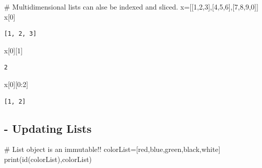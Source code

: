\documentclass[
  a4paper,
  DIV=11,
  numbers=noendperiod]{scrreprt}
\newenvironment{Shaded}{\begin{snugshade}}{\end{snugshade}}
\newcommand{\BuiltInTok}[1]{\textcolor[rgb]{0.00,0.23,0.31}{#1}}
\newcommand{\CommentTok}[1]{\textcolor[rgb]{0.37,0.37,0.37}{#1}}
\newcommand{\DecValTok}[1]{\textcolor[rgb]{0.68,0.00,0.00}{#1}}
\newcommand{\NormalTok}[1]{\textcolor[rgb]{0.00,0.23,0.31}{#1}}
\newcommand{\OperatorTok}[1]{\textcolor[rgb]{0.37,0.37,0.37}{#1}}
\newcommand{\StringTok}[1]{\textcolor[rgb]{0.13,0.47,0.30}{#1}}
\begin{document}
\begin{Shaded}
\begin{Highlighting}[]
\CommentTok{\# Multidimensional lists can alse be indexed and sliced.}
\NormalTok{x}\OperatorTok{=}\NormalTok{[[}\DecValTok{1}\NormalTok{,}\DecValTok{2}\NormalTok{,}\DecValTok{3}\NormalTok{],[}\DecValTok{4}\NormalTok{,}\DecValTok{5}\NormalTok{,}\DecValTok{6}\NormalTok{],[}\DecValTok{7}\NormalTok{,}\DecValTok{8}\NormalTok{,}\DecValTok{9}\NormalTok{,}\DecValTok{0}\NormalTok{]]}
\NormalTok{x[}\DecValTok{0}\NormalTok{]}
\end{Highlighting}
\end{Shaded}

\begin{verbatim}
[1, 2, 3]
\end{verbatim}

\begin{Shaded}
\begin{Highlighting}[]
\NormalTok{x[}\DecValTok{0}\NormalTok{][}\DecValTok{1}\NormalTok{]}
\end{Highlighting}
\end{Shaded}

\begin{verbatim}
2
\end{verbatim}

\begin{Shaded}
\begin{Highlighting}[]
\NormalTok{x[}\DecValTok{0}\NormalTok{][}\DecValTok{0}\NormalTok{:}\DecValTok{2}\NormalTok{]}
\end{Highlighting}
\end{Shaded}

\begin{verbatim}
[1, 2]
\end{verbatim}

\subsection{- Updating Lists}\label{updating-lists}

\begin{Shaded}
\begin{Highlighting}[]
\CommentTok{\# List object is an immutable!!}
\NormalTok{colorList}\OperatorTok{=}\NormalTok{[}\StringTok{\textquotesingle{}red\textquotesingle{}}\NormalTok{,}\StringTok{\textquotesingle{}blue\textquotesingle{}}\NormalTok{,}\StringTok{\textquotesingle{}green\textquotesingle{}}\NormalTok{,}\StringTok{\textquotesingle{}black\textquotesingle{}}\NormalTok{,}\StringTok{\textquotesingle{}white\textquotesingle{}}\NormalTok{]}
\BuiltInTok{print}\NormalTok{(}\BuiltInTok{id}\NormalTok{(colorList),colorList)}
\end{Highlighting}
\end{Shaded}
\end{document}

